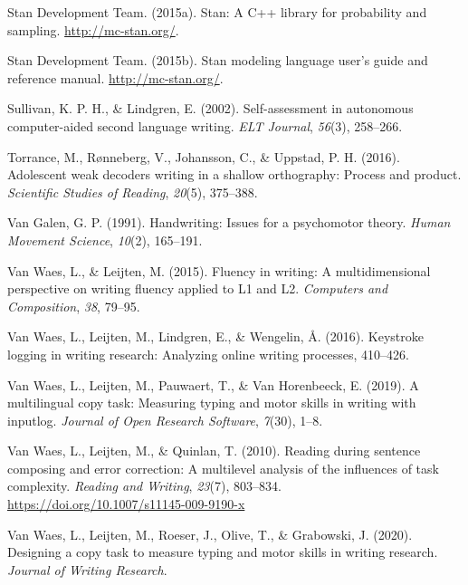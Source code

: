 \documentclass[
  english,
  man,mask,floatsintext]{apa7}
\newlength{\cslhangindent}
\newenvironment{cslreferences}%
  {\setlength{\parindent}{0pt}%
  \everypar{\setlength{\hangindent}{\cslhangindent}}\ignorespaces}%
  {\par}
\begin{document}
\begin{cslreferences}
\leavevmode\hypertarget{ref-rstan}{}%
Stan Development Team. (2015a). Stan: A C++ library for probability and sampling. \url{http://mc-stan.org/}.

\leavevmode\hypertarget{ref-rstan2}{}%
Stan Development Team. (2015b). Stan modeling language user's guide and reference manual. \url{http://mc-stan.org/}.

\leavevmode\hypertarget{ref-sullivan2002self}{}%
Sullivan, K. P. H., \& Lindgren, E. (2002). Self-assessment in autonomous computer-aided second language writing. \emph{ELT Journal}, \emph{56}(3), 258--266.

\leavevmode\hypertarget{ref-torrance2016adolescent}{}%
Torrance, M., Rønneberg, V., Johansson, C., \& Uppstad, P. H. (2016). Adolescent weak decoders writing in a shallow orthography: Process and product. \emph{Scientific Studies of Reading}, \emph{20}(5), 375--388.

\leavevmode\hypertarget{ref-van1991handwriting}{}%
Van Galen, G. P. (1991). Handwriting: Issues for a psychomotor theory. \emph{Human Movement Science}, \emph{10}(2), 165--191.

\leavevmode\hypertarget{ref-van2015fluency}{}%
Van Waes, L., \& Leijten, M. (2015). Fluency in writing: A multidimensional perspective on writing fluency applied to L1 and L2. \emph{Computers and Composition}, \emph{38}, 79--95.

\leavevmode\hypertarget{ref-van2016keystroke}{}%
Van Waes, L., Leijten, M., Lindgren, E., \& Wengelin, Å. (2016). Keystroke logging in writing research: Analyzing online writing processes, 410--426.

\leavevmode\hypertarget{ref-van2019multilingual}{}%
Van Waes, L., Leijten, M., Pauwaert, T., \& Van Horenbeeck, E. (2019). A multilingual copy task: Measuring typing and motor skills in writing with inputlog. \emph{Journal of Open Research Software}, \emph{7}(30), 1--8.

\leavevmode\hypertarget{ref-van2010reading}{}%
Van Waes, L., Leijten, M., \& Quinlan, T. (2010). Reading during sentence composing and error correction: A multilevel analysis of the influences of task complexity. \emph{Reading and Writing}, \emph{23}(7), 803--834. \url{https://doi.org/10.1007/s11145-009-9190-x}

\leavevmode\hypertarget{ref-waes2019}{}%
Van Waes, L., Leijten, M., Roeser, J., Olive, T., \& Grabowski, J. (2020). Designing a copy task to measure typing and motor skills in writing research. \emph{Journal of Writing Research}.


\end{cslreferences}
\end{document}
